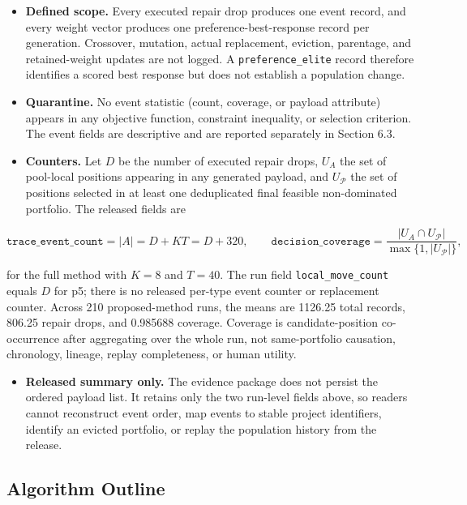 \documentclass[energies,article,submit,moreauthors]{Definitions/mdpi}
\providecommand{\tightlist}{\setlength{\itemsep}{0pt}\setlength{\parskip}{0pt}}
\begin{document}
\begin{itemize}
\tightlist
\item
  \textbf{Defined scope.} Every executed repair drop produces one event record, and every weight vector produces one preference-best-response record per generation. Crossover, mutation, actual replacement, eviction, parentage, and retained-weight updates are not logged. A \texttt{preference\_elite} record therefore identifies a scored best response but does not establish a population change.
\item
  \textbf{Quarantine.} No event statistic (count, coverage, or payload attribute) appears in any objective function, constraint inequality, or selection criterion. The event fields are descriptive and are reported separately in Section 6.3.
\item
  \textbf{Counters.} Let \(D\) be the number of executed repair drops, \(U_A\) the set of pool-local positions appearing in any generated payload, and \(U_{\mathcal P}\) the set of positions selected in at least one deduplicated final feasible non-dominated portfolio. The released fields are
\end{itemize}

\[
\texttt{trace\_event\_count}=|A|=D+K T=D+320,
\qquad
\texttt{decision\_coverage}=\frac{|U_A\cap U_{\mathcal P}|}{\max\{1,|U_{\mathcal P}|\}},
\]

for the full method with \(K=8\) and \(T=40\). The run field \texttt{local\_move\_count} equals \(D\) for p5; there is no released per-type event counter or replacement counter. Across 210 proposed-method runs, the means are 1126.25 total records, 806.25 repair drops, and 0.985688 coverage. Coverage is candidate-position co-occurrence after aggregating over the whole run, not same-portfolio causation, chronology, lineage, replay completeness, or human utility.

\begin{itemize}
\tightlist
\item
  \textbf{Released summary only.} The evidence package does not persist the ordered payload list. It retains only the two run-level fields above, so readers cannot reconstruct event order, map events to stable project identifiers, identify an evicted portfolio, or replay the population history from the release.
\end{itemize}

\subsection{Algorithm Outline}\label{algorithm-outline}
\end{document}

